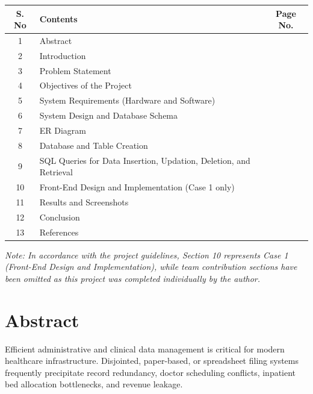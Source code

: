 \documentclass[12pt,a4paper]{article}
\begin{document}
\begin{table}[H]
\centering
\begin{tabularx}{\textwidth}{|c|X|c|}
\hline
\textbf{S. No} & \textbf{Contents} & \textbf{Page No.} \\
\hline
1 & Abstract & \pageref{sec:abstract} \\
\hline
2 & Introduction & \pageref{sec:intro} \\
\hline
3 & Problem Statement & \pageref{sec:prob} \\
\hline
4 & Objectives of the Project & \pageref{sec:obj} \\
\hline
5 & System Requirements (Hardware and Software) & \pageref{sec:req} \\
\hline
6 & System Design and Database Schema & \pageref{sec:design} \\
\hline
7 & ER Diagram & \pageref{sec:erd} \\
\hline
8 & Database and Table Creation & \pageref{sec:ddl} \\
\hline
9 & SQL Queries for Data Insertion, Updation, Deletion, and Retrieval & \pageref{sec:dml} \\
\hline
10 & Front-End Design and Implementation (Case 1 only) & \pageref{sec:frontend} \\
\hline
11 & Results and Screenshots & \pageref{sec:results} \\
\hline
12 & Conclusion & \pageref{sec:conclusion} \\
\hline
13 & References & \pageref{sec:references} \\
\hline
\end{tabularx}
\end{table}

\vfill
\noindent\textit{\footnotesize Note: In accordance with the project guidelines, Section 10 represents Case 1 (Front-End Design and Implementation), while team contribution sections have been omitted as this project was completed individually by the author.}

\newpage
\setcounter{page}{1}

\section{Abstract}
\label{sec:abstract}

Efficient administrative and clinical data management is critical for modern healthcare infrastructure. Disjointed, paper-based, or spreadsheet filing systems frequently precipitate record redundancy, doctor scheduling conflicts, inpatient bed allocation bottlenecks, and revenue leakage. 
\end{document}
